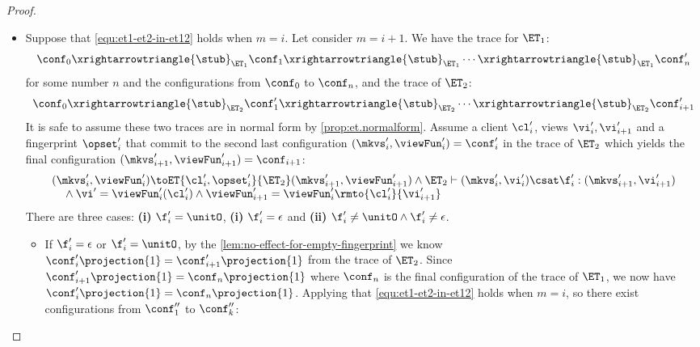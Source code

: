 \begin{proof}
\begin{itemize}
\item {}
Suppose that \cref{equ:et1-et2-in-et12} holds when \( m = i \).
Let consider \( m = i + 1 \).
We have the trace for \( \ET_1 \):
\begin{equation}
    \conf_0 \xrightarrowtriangle{\stub}_{\ET_{1}} \conf_1 \xrightarrowtriangle{\stub}_{\ET_{1}} \cdots \xrightarrowtriangle{\stub}_{\ET_{1}} \conf'_{n} 
\end{equation}
for some number \( n \) and the configurations from \(\conf_0\) to \( \conf_n \), and the trace of \(\ET_2\):
\begin{equation}
    \conf_0 \xrightarrowtriangle{\stub}_{\ET_{2}} \conf'_1 \xrightarrowtriangle{\stub}_{\ET_{2}} \cdots \xrightarrowtriangle{\stub}_{\ET_{2}} \conf'_{i+1} 
\end{equation}
It is safe to assume these two traces are in normal form by \cref{prop:et.normalform}.
Assume a client \( \cl'_{i} \), views \( \vi'_{i}, \vi'_{i+1} \) and a fingerprint \( \opset'_{i} \) that commit to the second last configuration \( (\mkvs'_i, \viewFun'_i) = \conf'_i \) in the trace of \( \ET_2 \) which yields the final configuration \( (\mkvs'_{i+1}, \viewFun'_{i+1}) = \conf_{i+1} \):
\begin{equation}
    \label{equ:last-et-2}
    \begin{array}{@{}l @{}}
        (\mkvs'_i, \viewFun'_i) \toET{\cl'_{i}, \opset'_{i}}{\ET_2} (\mkvs'_{i+1}, \viewFun'_{i+1}) \land \ET_2 \vdash (\mkvs'_i, \vi'_i) \csat \f'_i  : (\mkvs'_{i+1},\vi'_{i+1}) \\
        \quad {} \land \vi' = \viewFun'_i(\cl'_i) \land \viewFun'_{i+1} = \viewFun'_i\rmto{\cl'_i}{\vi'_{i+1}}
    \end{array}
\end{equation}
There are three cases: \textbf{(i)} \( \f'_i = \unitO \), \textbf{(i)} \( \f'_i = \epsilon \) and \textbf{(ii)} \( \f'_i \neq \unitO \land \f'_i \neq \epsilon \).
\begin{itemize}
    \item If \( \f'_i = \epsilon \) or \( \f'_i = \unitO \), by the \cref{lem:no-effect-for-empty-fingerprint} we know \( \conf'_{i}\projection{1} = \conf'_{i+1}\projection{1}\) from the trace of \( \ET_2 \).
Since \( \conf'_{i+1}\projection{1} = \conf_n\projection{1}\) where \( \conf_n \) is the final configuration of the trace of \( \ET_1 \), we now have \( \conf'_{i}\projection{1} = \conf_n\projection{1}\).
Applying \ih that \cref{equ:et1-et2-in-et12} holds when \( m = i \), so there exist configurations from \( \conf''_1 \) to \( \conf''_k \):

\end{itemize}
\end{itemize}
\end{proof}
